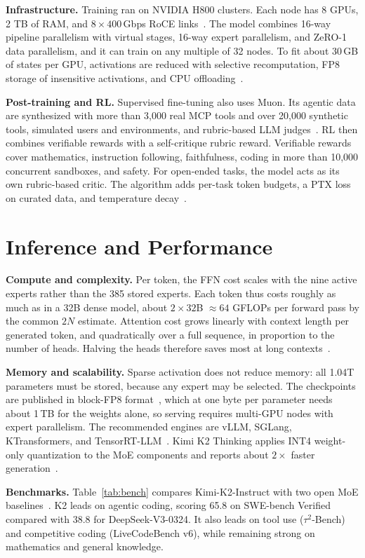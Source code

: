 \documentclass[conference]{IEEEtran}
\begin{document}
\textbf{Infrastructure.} Training ran on NVIDIA H800 clusters. Each node has 8 GPUs, 2 TB of RAM, and $8\times400$\,Gbps RoCE links~\cite{kimik2}. The model combines 16-way pipeline parallelism with virtual stages, 16-way expert parallelism, and ZeRO-1 data parallelism, and it can train on any multiple of 32 nodes. To fit about 30\,GB of states per GPU, activations are reduced with selective recomputation, FP8 storage of insensitive activations, and CPU offloading~\cite{kimik2}.

\textbf{Post-training and RL.} Supervised fine-tuning also uses Muon. Its agentic data are synthesized with more than 3,000 real MCP tools and over 20,000 synthetic tools, simulated users and environments, and rubric-based LLM judges~\cite{kimik2}. RL then combines verifiable rewards with a self-critique rubric reward. Verifiable rewards cover mathematics, instruction following, faithfulness, coding in more than 10,000 concurrent sandboxes, and safety. For open-ended tasks, the model acts as its own rubric-based critic. The algorithm adds per-task token budgets, a PTX loss on curated data, and temperature decay~\cite{kimik2}.

\section{Inference and Performance}
\textbf{Compute and complexity.} Per token, the FFN cost scales with the nine active experts rather than the 385 stored experts. Each token thus costs roughly as much as in a 32B dense model, about $2\times32$B $\approx64$ GFLOPs per forward pass by the common $2N$ estimate. Attention cost grows linearly with context length per generated token, and quadratically over a full sequence, in proportion to the number of heads. Halving the heads therefore saves most at long contexts~\cite{kimik2}.

\textbf{Memory and scalability.} Sparse activation does not reduce memory: all 1.04T parameters must be stored, because any expert may be selected. The checkpoints are published in block-FP8 format~\cite{kimik2github}, which at one byte per parameter needs about 1\,TB for the weights alone, so serving requires multi-GPU nodes with expert parallelism. The recommended engines are vLLM, SGLang, KTransformers, and TensorRT-LLM~\cite{kimik2github}. Kimi K2 Thinking applies INT4 weight-only quantization to the MoE components and reports about $2\times$ faster generation~\cite{kimik2thinking}.

\textbf{Benchmarks.} Table~\ref{tab:bench} compares Kimi-K2-Instruct with two open MoE baselines~\cite{kimik2}. K2 leads on agentic coding, scoring 65.8 on SWE-bench Verified compared with 38.8 for DeepSeek-V3-0324. It also leads on tool use ($\tau^2$-Bench) and competitive coding (LiveCodeBench v6), while remaining strong on mathematics and general knowledge.
\end{document}
